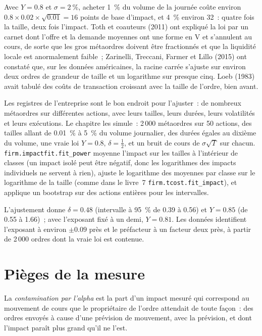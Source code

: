 Avec $Y=0.8$ et $\sigma=2~\%$, acheter 1~\% du volume de la journée coûte environ $0.8\times0.02\times\sqrt{0.01}=16$ points de base d'impact, et 4~\% environ 32~: quatre
fois la taille, deux fois l'impact. Toth et coauteurs (2011) ont expliqué la loi par un carnet dont l'offre et la demande moyennes ont une forme en V et s'annulent au
cours, de sorte que les gros métaordres doivent être fractionnés et que la liquidité locale est anormalement faible~; Zarinelli, Treccani, Farmer et Lillo (2015) ont constaté que, sur les
données américaines, la racine carrée s'ajuste sur environ deux ordres de grandeur de taille et un logarithme sur presque cinq. Loeb (1983) avait tabulé des coûts de transaction croissant
avec la taille de l'ordre, bien avant.

Les registres de l'entreprise sont le bon endroit pour l'ajuster~: de nombreux métaordres sur différentes actions, avec leurs tailles, leurs durées, leurs volatilités et leurs exécutions. Le chapitre
les simule~: 2\,000 métaordres sur 50 actions, des tailles allant de 0.01~\% à 5~\% du volume journalier, des durées égales au dixième du volume, une vraie loi $Y=0.8$,
$\delta=\tfrac12$, et un bruit de cours de $\sigma\sqrt T$ sur chacun. \texttt{firm.impactfit.fit\_power} moyenne l'impact sur les tailles à l'intérieur de classes (un impact
isolé peut être négatif, donc les logarithmes des impacts individuels ne servent à rien), ajuste le logarithme des moyennes par classe sur le logarithme de la taille (comme dans le livre~7
\texttt{firm.tcost.fit\_impact}), et applique un bootstrap sur des actions entières pour les intervalles.

\label{lst:mx:the-empirics-of-price-impact:fit}

L'ajustement donne $\delta=0.48$ (intervalle à 95~\% de 0.39 à 0.56) et $Y=0.85$ (de 0.55 à 1.66)~; avec l'exposant fixé à un demi, $Y=0.81$. Les données identifient
l'exposant à environ $\pm0.09$ près et le préfacteur à un facteur deux près, à partir de 2\,000 ordres dont la vraie loi est contenue.

\section{Pièges de la mesure}

\begin{definition}\label{def:mx:the-empirics-of-price-impact:alpha}
La \emph{contamination par l'alpha} est la part d'un impact mesuré qui correspond au mouvement de cours que le propriétaire de l'ordre attendait de toute façon~: des ordres
envoyés à cause d'une prévision de mouvement, avec la prévision, et dont l'impact paraît plus grand qu'il ne l'est.
\end{definition}

